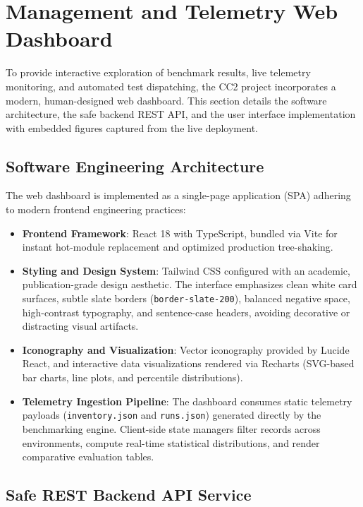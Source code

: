 \section{Management and Telemetry Web Dashboard}
\label{sec:dashboard}

To provide interactive exploration of benchmark results, live telemetry monitoring, and automated test dispatching, the CC2 project incorporates a modern, human-designed web dashboard. This section details the software architecture, the safe backend REST API, and the user interface implementation with embedded figures captured from the live deployment.

\subsection{Software Engineering Architecture}
\label{subsec:dashboard_architecture}

The web dashboard is implemented as a single-page application (SPA) adhering to modern frontend engineering practices:
\begin{itemize}
    \item \textbf{Frontend Framework}: React 18 with TypeScript, bundled via Vite for instant hot-module replacement and optimized production tree-shaking.
    \item \textbf{Styling and Design System}: Tailwind CSS configured with an academic, publication-grade design aesthetic. The interface emphasizes clean white card surfaces, subtle slate borders (\texttt{border-slate-200}), balanced negative space, high-contrast typography, and sentence-case headers, avoiding decorative or distracting visual artifacts.
    \item \textbf{Iconography and Visualization}: Vector iconography provided by Lucide React, and interactive data visualizations rendered via Recharts (SVG-based bar charts, line plots, and percentile distributions).
    \item \textbf{Telemetry Ingestion Pipeline}: The dashboard consumes static telemetry payloads (\texttt{inventory.json} and \texttt{runs.json}) generated directly by the benchmarking engine. Client-side state managers filter records across environments, compute real-time statistical distributions, and render comparative evaluation tables.
\end{itemize}

\subsection{Safe REST Backend API Service}
\label{subsec:backend_api}

